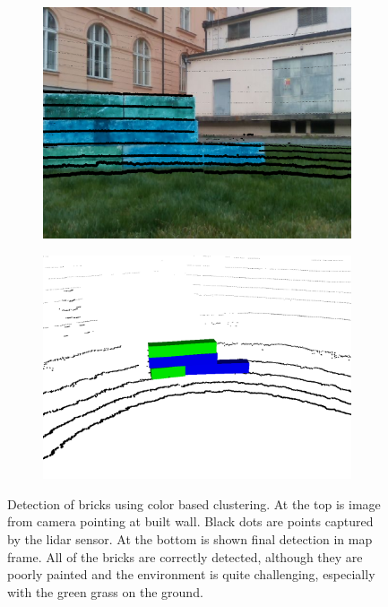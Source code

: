 \begin{figure}[H]
	\centering
	\begin{subfigure}{1\textwidth}
		\centering
		\includegraphics[scale=0.28]{fig/colors_camera}
	\end{subfigure}

	\vspace{5mm}

	\begin{subfigure}{1\textwidth}
		\centering
		\includegraphics[scale=0.27]{fig/colors_lidar}
		
	\end{subfigure}
	
	\caption[Colored pointcloud detections]{Detection of bricks using color based clustering. At the top is image from camera pointing at built wall. Black dots are points captured by the lidar sensor. At the bottom is shown final detection in map frame. All of the bricks are correctly detected, although they are poorly painted and the environment is quite challenging, especially with the green grass on the ground.}
	\label{fig:colors}
\end{figure}

\newpage
